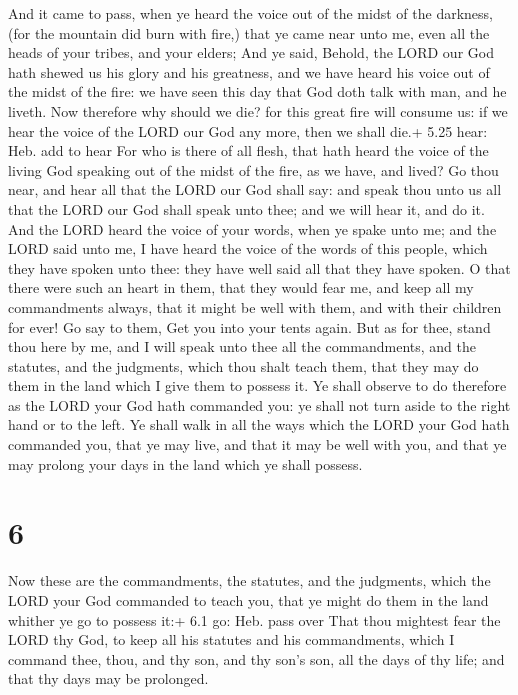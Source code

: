  And it came to pass, when ye heard the voice out of the
midst of the darkness, (for the mountain did burn with fire,) that ye
came near unto me, even all the heads of your tribes, and your elders;
 And ye said, Behold, the LORD our God hath shewed us his
glory and his greatness, and we have heard his voice out of the midst of
the fire: we have seen this day that God doth talk with man, and he
liveth.  Now therefore why should we die? for this great
fire will consume us: if we hear the voice of the LORD our God any more,
then we shall die.+ 5.25 hear: Heb. add to hear  For who is
there of all flesh, that hath heard the voice of the living God speaking
out of the midst of the fire, as we have, and lived?  Go
thou near, and hear all that the LORD our God shall say: and speak thou
unto us all that the LORD our God shall speak unto thee; and we will
hear it, and do it.  And the LORD heard the voice of your
words, when ye spake unto me; and the LORD said unto me, I have heard
the voice of the words of this people, which they have spoken unto thee:
they have well said all that they have spoken.  O that
there were such an heart in them, that they would fear me, and keep all
my commandments always, that it might be well with them, and with their
children for ever!  Go say to them, Get you into your tents
again.  But as for thee, stand thou here by me, and I will
speak unto thee all the commandments, and the statutes, and the
judgments, which thou shalt teach them, that they may do them in the
land which I give them to possess it.  Ye shall observe to
do therefore as the LORD your God hath commanded you: ye shall not turn
aside to the right hand or to the left.  Ye shall walk in
all the ways which the LORD your God hath commanded you, that ye may
live, and that it may be well with you, and that ye may prolong your
days in the land which ye shall possess.

\hypertarget{section-5}{%
\section{6}\label{section-5}}

 Now these are the commandments, the statutes, and the
judgments, which the LORD your God commanded to teach you, that ye might
do them in the land whither ye go to possess it:+ 6.1 go: Heb. pass over
 That thou mightest fear the LORD thy God, to keep all his
statutes and his commandments, which I command thee, thou, and thy son,
and thy son's son, all the days of thy life; and that thy days may be
prolonged.

